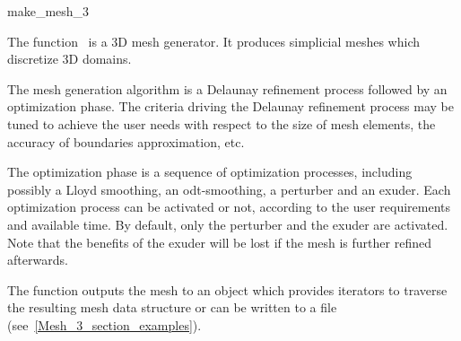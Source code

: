 \ccRefPageBegin


\begin{ccRefFunction}{make_mesh_3}  %


\ccDefinition

The function \ccRefName\ is a 3D
 mesh generator. It produces simplicial meshes which discretize
 3D domains.

The mesh generation algorithm is a Delaunay refinement process
followed by an optimization phase. 
The  criteria driving the Delaunay refinement
process may be tuned to achieve the user needs with respect to
the size of mesh elements, the accuracy of boundaries approximation,
etc.

The optimization phase is a sequence of optimization processes,
including possibly a Lloyd smoothing, an odt-smoothing,
a perturber and an exuder.
 Each optimization process
can be activated or not,
 according to the user requirements
and available time. 
By default, only the perturber and the exuder are activated.
Note that the benefits of the exuder will be lost if the mesh
is further refined afterwards.
 
The function outputs the mesh to an object which provides iterators to
traverse the resulting mesh data structure or can be written to a file
(see~\ref{Mesh_3_section_examples}).




\end{ccRefFunction}
